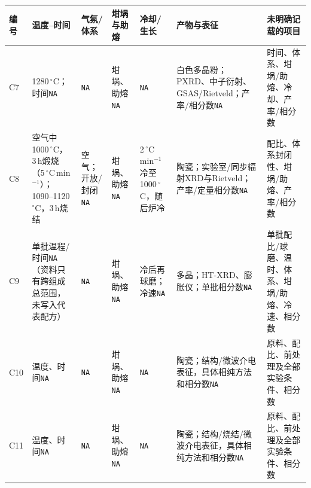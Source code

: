 \begin{table}[p]
\vspace{4pt}
\begin{tabular}{P{0.045\textwidth}P{0.15\textwidth}P{0.12\textwidth}P{0.17\textwidth}P{0.15\textwidth}P{0.17\textwidth}P{0.14\textwidth}}
\toprule
编号 & 温度--时间 & 气氛/体系 & 坩埚与助熔 & 冷却/生长 & 产物与表征 & 未明确记载的项目\\
\midrule
C7 & 1280\,$^\circ$C；时间\texttt{NA} & \texttt{NA} & 坩埚、助熔\texttt{NA} & \texttt{NA} & 白色多晶粉；PXRD、中子衍射、GSAS/Rietveld；产率/相分数\texttt{NA} & 时间、体系、坩埚/助熔、冷却、产率/相分数\\
C8 & 空气中1000\,$^\circ$C，3\,h煅烧（5\,$^\circ$C\,min$^{-1}$）；1090--1120\,$^\circ$C，3\,h烧结 & 空气；开放/封闭\texttt{NA} & 坩埚、助熔\texttt{NA} & 2\,$^\circ$C\,min$^{-1}$冷至1000\,$^\circ$C，随后炉冷 & 陶瓷；实验室/同步辐射XRD与Rietveld；产率/定量相分数\texttt{NA} & 配比、体系封闭性、坩埚/助熔、产率/相分数\\
C9 & 单批温程/时间\texttt{NA}（资料只有跨组成总范围，未写入代表配方） & \texttt{NA} & 坩埚、助熔\texttt{NA} & 冷后再球磨；冷速\texttt{NA} & 多晶；HT-XRD、膨胀仪；单批相分数\texttt{NA} & 单批配比/球磨、温时、体系、坩埚/助熔、冷速、相分数\\
C10 & 温度、时间\texttt{NA} & \texttt{NA} & 坩埚、助熔\texttt{NA} & \texttt{NA} & 陶瓷；结构/微波介电表征，具体相纯方法和相分数\texttt{NA} & 原料、配比、前处理及全部实验条件、相分数\\
C11 & 温度、时间\texttt{NA} & \texttt{NA} & 坩埚、助熔\texttt{NA} & \texttt{NA} & 陶瓷；结构/烧结/微波介电表征，具体相纯方法和相分数\texttt{NA} & 原料、配比、前处理及全部实验条件、相分数\\
\bottomrule
\end{tabular}
\end{table}
